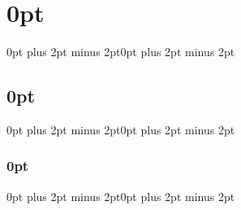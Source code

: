 
\usepackage{orcidlink} %

\usepackage{indentfirst} %
\setlength{\parindent}{0.5in} %
\setlength{\parskip}{0em} %

\usepackage{titlesec} %
\titlespacing\section{0pt}{0pt plus 2pt minus 2pt}{0pt plus 2pt minus 2pt}
\titlespacing\subsection{0pt}{0pt plus 2pt minus 2pt}{0pt plus 2pt minus 2pt}
\titlespacing\subsubsection{0pt}{0pt plus 2pt minus 2pt}{0pt plus 2pt minus 2pt}


\usepackage{caption}
\captionsetup{
  justification = raggedright, %
  singlelinecheck = true,      %
  labelfont = bf               %
}
\setlength{\abovecaptionskip}{10pt} %

\usepackage{rotating}        
\usepackage{pdflscape}


\usepackage{abstract}
\renewcommand{\abstractname}{ABSTRACT\vspace{.5em}}
\renewcommand{\abstractnamefont}{\normalfont\bfseries}
\renewcommand{\abstracttextfont}{\normalsize}
\setlength{\absleftindent}{\parindent}
\setlength{\absrightindent}{\parindent}


\usepackage{titling}
\pretitle{\par\vskip 3em\begin{center}\LARGE\bfseries}
\posttitle{\par\end{center}\vspace{2\baselineskip}}


